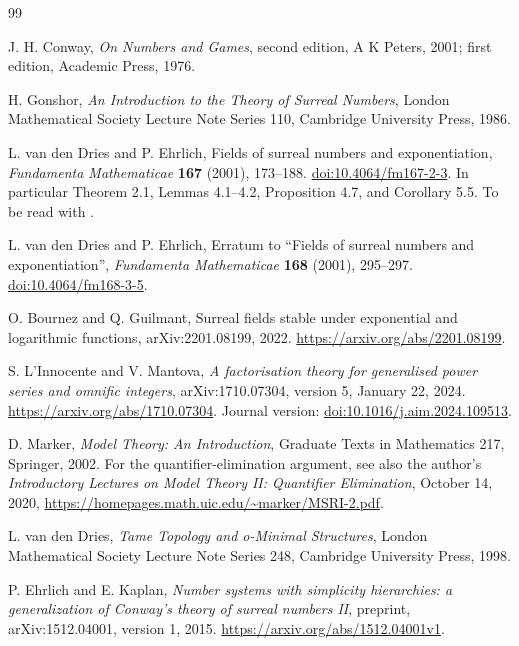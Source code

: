 \documentclass[11pt,a4paper]{article}
\numberwithin{equation}{section}
\theoremstyle{definition}
\theoremstyle{remark}
\begin{document}
\clearpage
\begin{thebibliography}{99}

J. H. Conway, \emph{On Numbers and Games}, second edition,
A K Peters, 2001; first edition, Academic Press, 1976.

H. Gonshor, \emph{An Introduction to the Theory of Surreal Numbers},
London Mathematical Society Lecture Note Series 110,
Cambridge University Press, 1986.

L. van den Dries and P. Ehrlich,
Fields of surreal numbers and exponentiation,
\emph{Fundamenta Mathematicae} \textbf{167} (2001), 173--188.
\href{https://doi.org/10.4064/fm167-2-3}{doi:10.4064/fm167-2-3}.
In particular Theorem 2.1, Lemmas 4.1--4.2, Proposition 4.7, and
Corollary 5.5. To be read with \cite{vdDEerr}.

L. van den Dries and P. Ehrlich, Erratum to ``Fields of surreal numbers and
exponentiation'', \emph{Fundamenta Mathematicae} \textbf{168} (2001),
295--297.
\href{https://doi.org/10.4064/fm168-3-5}{doi:10.4064/fm168-3-5}.

O. Bournez and Q. Guilmant, Surreal fields stable under exponential and
logarithmic functions, arXiv:2201.08199, 2022.
\url{https://arxiv.org/abs/2201.08199}.

S. L'Innocente and V. Mantova,
\emph{A factorisation theory for generalised power series and omnific
integers}, arXiv:1710.07304, version 5, January 22, 2024.
\url{https://arxiv.org/abs/1710.07304}.
Journal version: \href{https://doi.org/10.1016/j.aim.2024.109513}
{doi:10.1016/j.aim.2024.109513}.

D. Marker, \emph{Model Theory: An Introduction}, Graduate Texts in
Mathematics 217, Springer, 2002.
For the quantifier-elimination argument, see also the author's
\emph{Introductory Lectures on Model Theory II: Quantifier Elimination},
October 14, 2020,
\url{https://homepages.math.uic.edu/~marker/MSRI-2.pdf}.

L. van den Dries, \emph{Tame Topology and o-Minimal Structures}, London
Mathematical Society Lecture Note Series 248, Cambridge University Press,
1998.

P. Ehrlich and E. Kaplan, \emph{Number systems with simplicity hierarchies:
a generalization of Conway's theory of surreal numbers II}, preprint,
arXiv:1512.04001, version 1, 2015. \url{https://arxiv.org/abs/1512.04001v1}.


\end{thebibliography}
\end{document}
